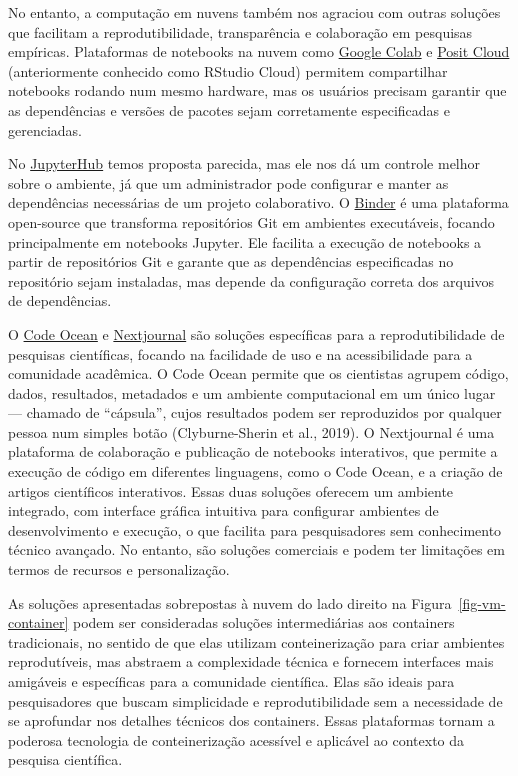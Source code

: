 \documentclass[
  a4paper,
]{book}
\begin{document}
No entanto, a computação em nuvens também nos agraciou com outras
soluções que facilitam a reprodutibilidade, transparência e colaboração
em pesquisas empíricas. Plataformas de notebooks na nuvem como
\href{https://colab.research.google.com/}{Google Colab} e
\href{https://posit.cloud/}{Posit Cloud} (anteriormente conhecido como
RStudio Cloud) permitem compartilhar notebooks rodando num mesmo
hardware, mas os usuários precisam garantir que as dependências e
versões de pacotes sejam corretamente especificadas e gerenciadas.

No \href{https://jupyter.org/hub}{JupyterHub} temos proposta parecida,
mas ele nos dá um controle melhor sobre o ambiente, já que um
administrador pode configurar e manter as dependências necessárias de um
projeto colaborativo. O \href{https://mybinder.org/}{Binder} é uma
plataforma open-source que transforma repositórios Git em ambientes
executáveis, focando principalmente em notebooks Jupyter. Ele facilita a
execução de notebooks a partir de repositórios Git e garante que as
dependências especificadas no repositório sejam instaladas, mas depende
da configuração correta dos arquivos de dependências.

O \href{https://codeocean.com/}{Code Ocean} e
\href{https://nextjournal.com/}{Nextjournal} são soluções específicas
para a reprodutibilidade de pesquisas científicas, focando na facilidade
de uso e na acessibilidade para a comunidade acadêmica. O Code Ocean
permite que os cientistas agrupem código, dados, resultados, metadados e
um ambiente computacional em um único lugar --- chamado de ``cápsula'',
cujos resultados podem ser reproduzidos por qualquer pessoa num simples
botão (Clyburne-Sherin et al., 2019). O Nextjournal é uma plataforma de
colaboração e publicação de notebooks interativos, que permite a
execução de código em diferentes linguagens, como o Code Ocean, e a
criação de artigos científicos interativos. Essas duas soluções oferecem
um ambiente integrado, com interface gráfica intuitiva para configurar
ambientes de desenvolvimento e execução, o que facilita para
pesquisadores sem conhecimento técnico avançado. No entanto, são
soluções comerciais e podem ter limitações em termos de recursos e
personalização.

As soluções apresentadas sobrepostas à nuvem do lado direito na
Figura~\ref{fig-vm-container} podem ser consideradas soluções
intermediárias aos containers tradicionais, no sentido de que elas
utilizam conteinerização para criar ambientes reprodutíveis, mas
abstraem a complexidade técnica e fornecem interfaces mais amigáveis e
específicas para a comunidade científica. Elas são ideais para
pesquisadores que buscam simplicidade e reprodutibilidade sem a
necessidade de se aprofundar nos detalhes técnicos dos containers. Essas
plataformas tornam a poderosa tecnologia de conteinerização acessível e
aplicável ao contexto da pesquisa científica.
\end{document}
